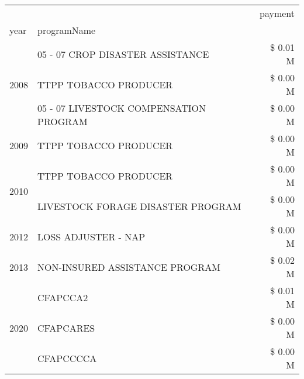 \begin{tabular}{llr}
\toprule
 &  & payment \\
year & programName &  \\
\midrule
\multirow[t]{3}{*}{2008} & 05 - 07 CROP DISASTER ASSISTANCE & \$ 0.01 M \\
 & TTPP TOBACCO PRODUCER & \$ 0.00 M \\
 & 05 - 07 LIVESTOCK COMPENSATION PROGRAM & \$ 0.00 M \\
\cline{1-3}
2009 & TTPP TOBACCO PRODUCER & \$ 0.00 M \\
\cline{1-3}
\multirow[t]{2}{*}{2010} & TTPP TOBACCO PRODUCER & \$ 0.00 M \\
 & LIVESTOCK FORAGE DISASTER  PROGRAM & \$ 0.00 M \\
\cline{1-3}
2012 & LOSS ADJUSTER - NAP & \$ 0.00 M \\
\cline{1-3}
2013 & NON-INSURED ASSISTANCE PROGRAM & \$ 0.02 M \\
\cline{1-3}
\multirow[t]{3}{*}{2020} & CFAPCCA2 & \$ 0.01 M \\
 & CFAPCARES & \$ 0.00 M \\
 & CFAPCCCCA & \$ 0.00 M \\
\cline{1-3}
\bottomrule
\end{tabular}
